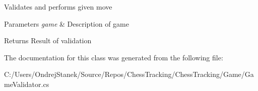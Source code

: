 Validates and performs given move 


\begin{DoxyParams}{Parameters}
{\em game} & Description of game\\
\hline
\end{DoxyParams}
\begin{DoxyReturn}{Returns}
Result of validation
\end{DoxyReturn}


The documentation for this class was generated from the following file\+:\begin{DoxyCompactItemize}
\item 
C\+:/\+Users/\+Ondrej\+Stanek/\+Source/\+Repos/\+Chess\+Tracking/\+Chess\+Tracking/\+Game/Game\+Validator.\+cs\end{DoxyCompactItemize}
